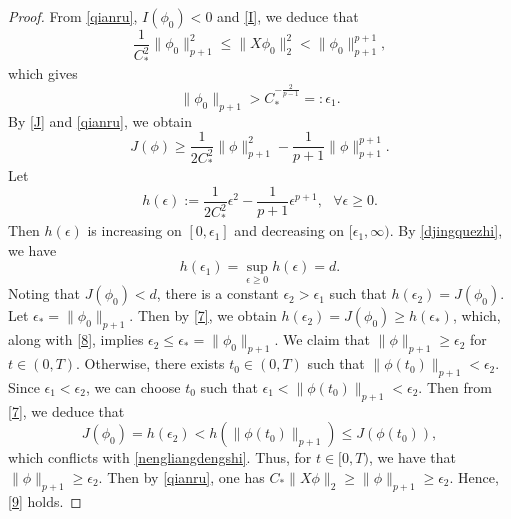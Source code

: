 \documentclass[11pt,a4paper]{article}
\numberwithin{equation}{section}
\numberwithin{remark}{section}
\begin{document}
\begin{proof}
From \eqref{qianru}, $I(\phi_0)<0$ and \eqref{I}, we deduce that
\begin{equation*}
\frac{1}{C_*^2}\|\phi_0\|_{p+1}^2\leq\|X\phi_0\|_2^2<\|\phi_0\|_{p+1}^{p+1},
\end{equation*}
which gives
\begin{equation}\label{8}
\|\phi_0\|_{p+1}>C_*^{-\frac{2}{p-1}}=:\epsilon_1.
\end{equation}
By \eqref{J} and \eqref{qianru}, we obtain
\begin{equation}\label{7}
J(\phi)\geq\frac{1}{2C_*^2}\|\phi\|_{p+1}^2-\frac{1}{p+1}\|\phi\|_{p+1}^{p+1}.
\end{equation}
Let
\begin{equation*}
h(\epsilon):=\frac{1}{2C_*^2}\epsilon^2-\frac{1}{p+1}\epsilon^{p+1},\ \ \ \forall\epsilon\geq0.
\end{equation*}
Then $h(\epsilon)$ is increasing on $[0,\epsilon_1]$ and decreasing on $[\epsilon_1,\infty)$. By \eqref{djingquezhi}, we have
\begin{equation*}
h(\epsilon_1)=\sup\limits_{\epsilon\geq0}h(\epsilon)=d.
\end{equation*}
Noting that $J(\phi_0)<d$, there is a constant $\epsilon_2>\epsilon_1$ such that $h(\epsilon_2)=J(\phi_0)$. Let $\epsilon_*=\|\phi_0\|_{p+1}$. Then by \eqref{7}, we obtain $h(\epsilon_2)=J(\phi_0)\geq h(\epsilon_*)$, which, along with \eqref{8}, implies $\epsilon_2\leq\epsilon_*=\|\phi_0\|_{p+1}$.
We claim that $\|\phi\|_{p+1}\geq\epsilon_2$ for $t\in(0,T)$. Otherwise, there exists $t_0\in(0,T)$ such that $\|\phi(t_0)\|_{p+1}<\epsilon_2$. Since $\epsilon_1<\epsilon_2$, we can choose $t_0$ such that $\epsilon_1<\|\phi(t_0)\|_{p+1}<\epsilon_2$. Then from \eqref{7}, we deduce that
$$
J(\phi_0)=h(\epsilon_2)<h(\|\phi(t_0)\|_{p+1})\leq J(\phi(t_0)),
$$
which conflicts with \eqref{nengliangdengshi}. Thus, for $t\in[0,T)$, we have that $\|\phi\|_{p+1}\geq\epsilon_2$. Then by \eqref{qianru}, one has $C_*\|X\phi\|_2\geq\|\phi\|_{p+1}\geq\epsilon_2$. Hence, \eqref{9} holds.


\end{proof}
\end{document}
